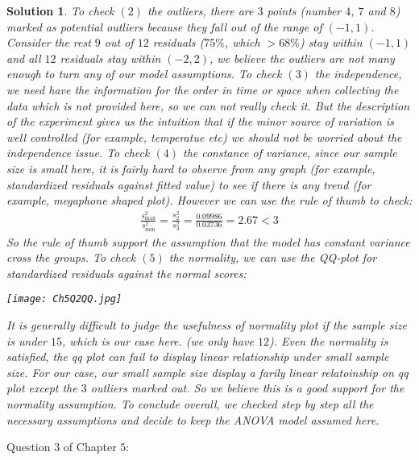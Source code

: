 \documentclass[11pt]{article}
\newtheorem{sol}{Solution}
\begin{document}
\begin{sol}
	To check $(2)$ the outliers, there are $3$ points (number $4$, $7$ and $8$) marked as potential outliers because they fall out of the range of $(-1, 1)$. Consider the rest $9$ out of $12$ residuals ($75\%$, which $> 68\%$) stay within $(-1, 1)$ and all $12$ residuals stay within $(-2, 2)$, we believe the outliers are not many enough to turn any of our model assumptions.\vskip 2mm
	To check $(3)$ the independence, we need have the information for the order in time or space when collecting the data which is not provided here, so we can not really check it. But the description of the experiment gives us the intuition that if the minor source of variation is well controlled (for example, temperatue etc) we should not be worried about the independence issue.\vskip 2mm
	To check $(4)$ the constance of variance, since our sample size is small here, it is fairly hard to observe from any graph (for example, standardized residuals against fitted value) to see if there is any trend (for example, megaphone shaped plot). However we can use the rule of thumb to check:
	\begin{align*}
		\frac{s^2_{\max}}{s^2_{\min}} = \frac{s^2_{2}}{s^2_{3}} = \frac{0.09986}{0.03736} = 2.67 < 3
	\end{align*}
	So the rule of thumb support the assumption that the model has constant variance cross the groups.\vskip 2mm
	To check $(5)$ the normality, we can use the QQ-plot for standardized residuals against the normal scores:\vskip 2mm
	\begin{center}
		\texttt{[image: Ch5Q2QQ.jpg]}
	\end{center}
	It is generally difficult to judge the usefulness of normality plot if the sample size is under $15$, which is our case here. (we only have $12$). Even the normality is satisfied, the qq plot can fail to display linear relationship under small sample size. For our case, our small sample size display a farily linear relatoinship on qq plot except the $3$ outliers marked out. So we believe this is a good support for the normality assumption.\vskip 2mm
	To conclude overall, we checked step by step all the necessary assumptions and decide to keep the ANOVA model assumed here.
\end{sol}
Question $3$ of Chapter $5$:
\end{document}
